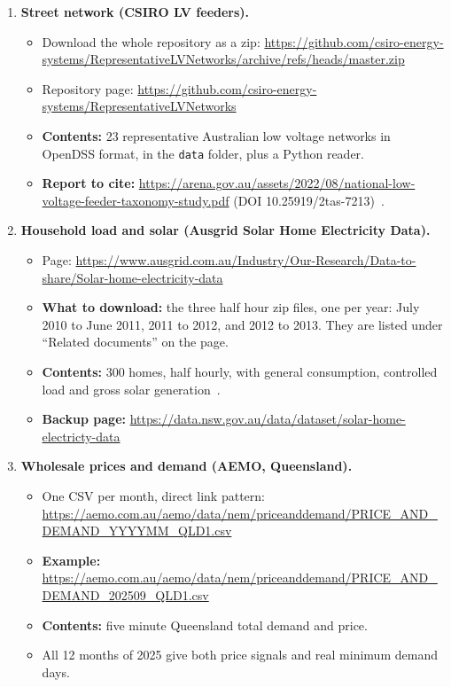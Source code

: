 \documentclass[11pt,a4paper]{article}
\begin{document}
\begin{enumerate}[leftmargin=1.6em, itemsep=6pt]
\item \textbf{Street network (CSIRO LV feeders).}
\begin{itemize}
  \item Download the whole repository as a zip: \url{https://github.com/csiro-energy-systems/RepresentativeLVNetworks/archive/refs/heads/master.zip}
  \item Repository page: \url{https://github.com/csiro-energy-systems/RepresentativeLVNetworks}
  \item \textbf{Contents:} 23 representative Australian low voltage networks in OpenDSS format, in the \texttt{data} folder, plus a Python reader.
  \item \textbf{Report to cite:} \url{https://arena.gov.au/assets/2022/08/national-low-voltage-feeder-taxonomy-study.pdf} (DOI 10.25919/2tas-7213)~\cite{csiro_lv}.
\end{itemize}

\item \textbf{Household load and solar (Ausgrid Solar Home Electricity Data).}
\begin{itemize}
  \item Page: \url{https://www.ausgrid.com.au/Industry/Our-Research/Data-to-share/Solar-home-electricity-data}
  \item \textbf{What to download:} the three half hour zip files, one per year: July 2010 to June 2011, 2011 to 2012, and 2012 to 2013. They are listed under ``Related documents'' on the page.
  \item \textbf{Contents:} 300 homes, half hourly, with general consumption, controlled load and gross solar generation~\cite{ausgrid}.
  \item \textbf{Backup page:} \url{https://data.nsw.gov.au/data/dataset/solar-home-electricty-data}
\end{itemize}

\item \textbf{Wholesale prices and demand (AEMO, Queensland).}
\begin{itemize}
  \item One CSV per month, direct link pattern: \url{https://aemo.com.au/aemo/data/nem/priceanddemand/PRICE_AND_DEMAND_YYYYMM_QLD1.csv}
  \item \textbf{Example:} \url{https://aemo.com.au/aemo/data/nem/priceanddemand/PRICE_AND_DEMAND_202509_QLD1.csv}
  \item \textbf{Contents:} five minute Queensland total demand and price.
  \item All 12 months of 2025 give both price signals and real minimum demand days.
\end{itemize}


\end{enumerate}
\end{document}
